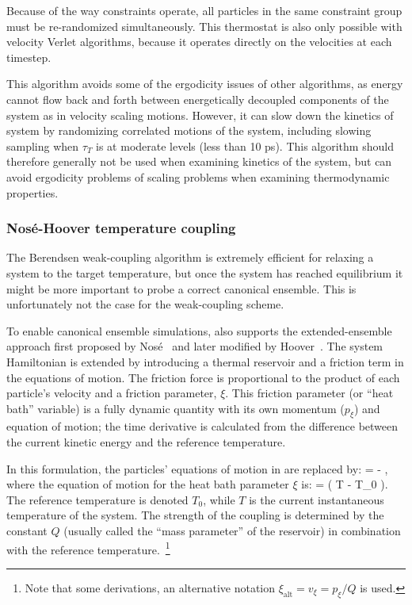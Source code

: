 Because of the way constraints operate, all particles in the same
constraint group must be re-randomized simultaneously.  This
thermostat is also only possible with velocity Verlet algorithms,
because it operates directly on the velocities at each timestep.

This algorithm avoids some of the ergodicity issues of other
algorithms, as energy cannot flow back and forth between energetically
decoupled components of the system as in velocity scaling motions.
However, it can slow down the kinetics of system by randomizing
correlated motions of the system, including slowing sampling when
$\tau_T$ is at moderate levels (less than 10 ps). This algorithm
should therefore generally not be used when examining kinetics of the
system, but can avoid ergodicity problems of scaling problems when
examining thermodynamic properties.

\subsubsection{Nos{\'e}-Hoover temperature coupling}

The Berendsen weak-coupling algorithm is
extremely efficient for relaxing a system to the target temperature,
but once the system has reached equilibrium it might be more
important to probe a correct canonical ensemble. This is unfortunately
not the case for the weak-coupling scheme.

To enable canonical ensemble simulations, {\gromacs} also supports the
extended-ensemble approach first proposed by Nos{\'e}~\cite{Nose84}
and later modified by Hoover~\cite{Hoover85}. The system Hamiltonian is
extended by introducing a thermal reservoir and a friction term in the
equations of motion.  The friction force is proportional to the
product of each particle's velocity and a friction parameter, $\xi$.
This friction parameter (or ``heat bath'' variable) is a fully
dynamic quantity with its own momentum ($p_{\xi}$) and equation of
motion; the time derivative is calculated from the difference between
the current kinetic energy and the reference temperature.  

In this formulation, the particles' equations of motion in
 are replaced by:
\beq
{} =  - 
 ,
\label{eqn:NH-eqn-of-motion}
\eeq where the equation of motion for the heat bath parameter $\xi$ is:
\beq {} = \left( T - T_0 \right).  \eeq The
reference temperature is denoted $T_0$, while $T$ is the current
instantaneous temperature of the system. The strength of the coupling
is determined by the constant $Q$ (usually called the ``mass parameter''
of the reservoir) in combination with the reference
temperature.~\footnote{Note that some derivations, an alternative
  notation $\xi_{\mathrm{alt}} = v_{\xi} = p_{\xi}/Q$ is used.}

